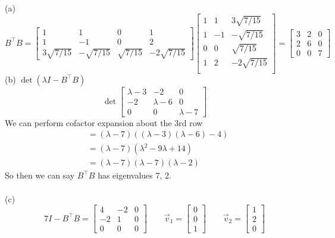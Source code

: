 \documentclass{report}
\begin{document}
\sol \\
(a)
$$
B^\top B = \begin{bmatrix}
1&1&0&1\\
1&-1&0&2\\
3\sqrt{7/15}&-\sqrt{7/15}&\sqrt{7/15}&-2\sqrt{7/15}
\end{bmatrix}
\begin{bmatrix}
1&1&3\sqrt{7/15}\\
1&-1&-\sqrt{7/15}\\
0&0&\sqrt{7/15}\\
1&2&-2\sqrt{7/15}\\
\end{bmatrix}=\begin{bmatrix}
3&2&0\\
2&6&0\\
0&0&7
\end{bmatrix}
$$
(b) $\det(\lambda I - B^\top B)$
$$
\det\begin{bmatrix}
\lambda-3&-2&0\\
-2&\lambda-6&0\\
0&0&\lambda-7
\end{bmatrix}
$$
We can perform cofactor expansion about the 3rd row
$$
\begin{aligned}
&=(\lambda-7)((\lambda-3)(\lambda-6)-4)\\
&=(\lambda-7)(\lambda^2-9\lambda+14)\\
&=(\lambda-7)(\lambda-7)(\lambda-2)
\end{aligned}
$$
So then we can say $B^\top B$ has eigenvalues 7, 2.\\
\\
\noindent(c)
$$
7I - B^\top B = \begin{bmatrix}
4&-2&0\\
-2&1&0\\
0&0&0
\end{bmatrix}\qquad\vec{v}_1=\begin{bmatrix}0\\0\\1\end{bmatrix}\qquad\vec{v}_2=\begin{bmatrix}1\\2\\0\end{bmatrix}
$$
\end{document}
